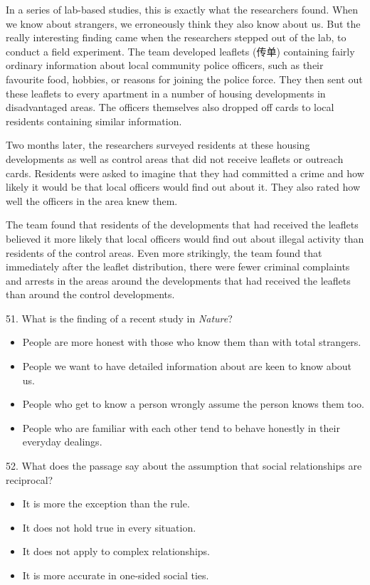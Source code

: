 \documentclass[UTF8,11pt]{ctexart}
\begin{document}
In a series of lab-based studies, this is exactly what the researchers found. When we know about strangers, we erroneously think they also know about us. But the really interesting finding came when the researchers stepped out of the lab, to conduct a field experiment. The team developed leaflets (传单) containing fairly ordinary information about local community police officers, such as their favourite food, hobbies, or reasons for joining the police force. They then sent out these leaflets to every apartment in a number of housing developments in disadvantaged areas. The officers themselves also dropped off cards to local residents containing similar information.


Two months later, the researchers surveyed residents at these housing developments as well as control areas that did not receive leaflets or outreach cards. Residents were asked to imagine that they had committed a crime and how likely it would be that local officers would find out about it. They also rated how well the officers in the area knew them.


The team found that residents of the developments that had received the leaflets believed it more likely that local officers would find out about illegal activity than residents of the control areas. Even more strikingly, the team found that immediately after the leaflet distribution, there were fewer criminal complaints and arrests in the areas around the developments that had received the leaflets than around the control developments.


51. What is the finding of a recent study in \textit{Nature}?


\begin{itemize}[leftmargin=2em,itemsep=.2em,topsep=.4em]\item[A.] People are more honest with those who know them than with total strangers.
\item[B.] People we want to have detailed information about are keen to know about us.
\item[C.] People who get to know a person wrongly assume the person knows them too.
\item[D.] People who are familiar with each other tend to behave honestly in their everyday dealings.
\end{itemize}

52. What does the passage say about the assumption that social relationships are reciprocal?


\begin{itemize}[leftmargin=2em,itemsep=.2em,topsep=.4em]\item[A.] It is more the exception than the rule.
\item[B.] It does not hold true in every situation.
\item[C.] It does not apply to complex relationships.
\item[D.] It is more accurate in one-sided social ties.
\end{itemize}
\end{document}

